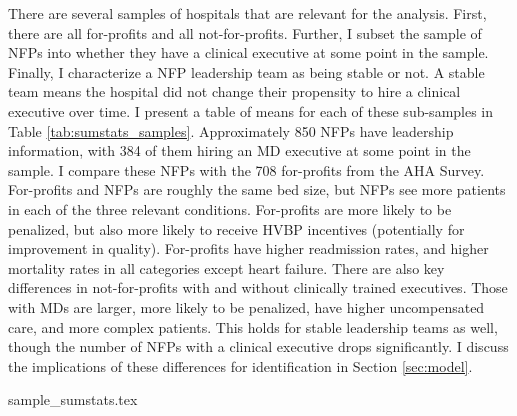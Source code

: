 \documentclass[12pt]{article}
\begin{document}


    There are several samples of hospitals that are relevant for the analysis. First, there are all for-profits and all not-for-profits. Further, I subset the sample of NFPs into whether they have a clinical executive at some point in the sample. Finally, I characterize a NFP leadership team as being stable or not. A stable team means the hospital did not change their propensity to hire a clinical executive over time. I present a table of means for each of these sub-samples in Table \ref{tab:sumstats_samples}. Approximately 850 NFPs have leadership information, with 384 of them hiring an MD executive at some point in the sample. I compare these NFPs with the 708 for-profits from the AHA Survey. For-profits and NFPs are roughly the same bed size, but NFPs see more patients in each of the three relevant conditions. For-profits are more likely to be penalized, but also more likely to receive HVBP incentives (potentially for improvement in quality). For-profits have higher readmission rates, and higher mortality rates in all categories except heart failure. There are also key differences in not-for-profits with and without clinically trained executives. Those with MDs are larger, more likely to be penalized, have higher uncompensated care, and more complex patients. This holds for stable leadership teams as well, though the number of NFPs with a clinical executive drops significantly. I discuss the implications of these differences for identification in Section \ref{sec:model}. 

    {sample_sumstats.tex}
\end{document}
